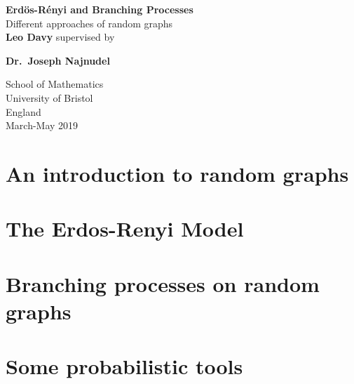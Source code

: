 \documentclass{report}
\theoremstyle{definition}
\begin{document}
\begin{titlepage}
	\begin{center}
		\vspace*{1cm}
		\huge
		\textbf{Erd\"os-R\'enyi and Branching Processes\\}
		\vspace*{0.5cm}
	        \LARGE
		Different approaches of random graphs\\ 
		\vspace{1.5cm}
		\textbf{Leo Davy}
		\vfill				      
	        supervised by\par
		\textbf{Dr.~Joseph Najnudel}
							    
		\vspace{0.8cm}
		
		\Large					  
		School of Mathematics\\
		University of Bristol\\
	        England\\
	        March-May 2019
				      
	\end{center}
\end{titlepage}


\tableofcontents{}

\chapter{An introduction to random graphs}


\chapter{The Erdos-Renyi Model}


\chapter{Branching processes on random graphs}


%

\appendix

\chapter{Some probabilistic tools}


\printbibliography[heading = bibintoc, title={References}]
\end{document}

